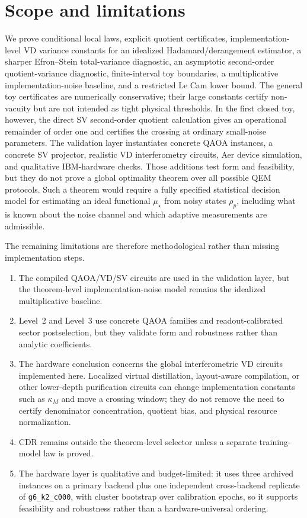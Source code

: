 \documentclass[11pt]{article}
\newcommand{\1}{\mathbf{1}}
\begin{document}
\section{Scope and limitations}

We prove conditional local laws, explicit quotient certificates, implementation-level VD variance constants for an idealized Hadamard/derangement estimator, a sharper Efron--Stein total-variance diagnostic, an asymptotic second-order quotient-variance diagnostic, finite-interval toy boundaries, a multiplicative implementation-noise baseline, and a restricted Le Cam lower bound.  The general toy certificates are numerically conservative; their large constants certify non-vacuity but are not intended as tight physical thresholds.  In the first closed toy, however, the direct SV second-order quotient calculation gives an operational remainder of order one and certifies the crossing at ordinary small-noise parameters.  The validation layer instantiates concrete QAOA instances, a concrete SV projector, realistic VD interferometry circuits, Aer device simulation, and qualitative IBM-hardware checks.  Those additions test form and feasibility, but they do not prove a global optimality theorem over all possible QEM protocols.  Such a theorem would require a fully specified statistical decision model for estimating an ideal functional \(\mu_\star\) from noisy states \(\rho_p\), including what is known about the noise channel and which adaptive measurements are admissible.

The remaining limitations are therefore methodological rather than missing implementation steps.
\begin{enumerate}[leftmargin=2em]
    \item The compiled QAOA/VD/SV circuits are used in the validation layer, but the theorem-level implementation-noise model remains the idealized multiplicative baseline.
    \item Level~2 and Level~3 use concrete QAOA families and readout-calibrated sector postselection, but they validate form and robustness rather than analytic coefficients.
    \item The hardware conclusion concerns the global interferometric VD circuits implemented here.  Localized virtual distillation, layout-aware compilation, or other lower-depth purification circuits can change implementation constants such as \(\kappa_M\) and move a crossing window; they do not remove the need to certify denominator concentration, quotient bias, and physical resource normalization.
    \item CDR remains outside the theorem-level selector unless a separate training-model law is proved.
    \item The hardware layer is qualitative and budget-limited: it uses three archived instances on a primary backend plus one independent cross-backend replicate of \texttt{g6\_k2\_c000}, with cluster bootstrap over calibration epochs, so it supports feasibility and robustness rather than a hardware-universal ordering.
\end{enumerate}
\end{document}
